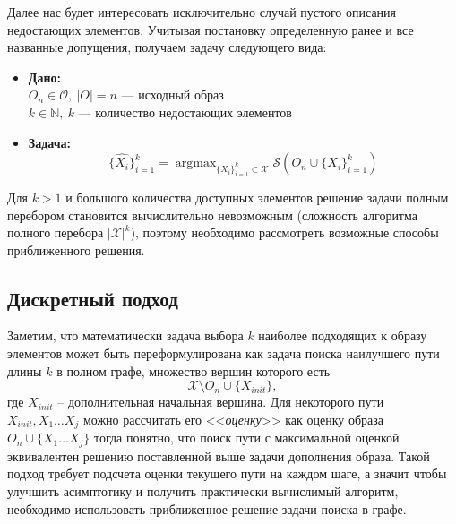 \documentclass[a4paper,14pt]{extarticle}
\DeclareMathOperator*{\argmax}{argmax}
\begin{document}
				Далее нас будет интересовать исключительно случай пустого описания недостающих элементов. Учитывая постановку определенную ранее и все названные допущения, получаем задачу следующего вида:
				\begin{itemize}
					\item[] \textbf{Дано:}\\
					$O_n\in\mathcal{O}, ~|O| = n$ --- исходный образ \\
					$k \in \mathbb{N}, ~k$ --- количество недостающих элементов\\					
					\item[] \textbf{Задача:}
					$$\{\hat{X_i}\}_{i=1}^k= \argmax_{\{X_i\}_{i=1}^k\subset\mathcal{X}} \mathcal{S}\left(O_n\cup\{X_i\}_{i=1}^k\right)$$
				\end{itemize}
				Для $k > 1$ и большого количества доступных элементов решение задачи полным перебором  становится вычислительно невозможным (сложность алгоритма полного перебора $|\mathcal{X}|^k$), поэтому необходимо рассмотреть возможные способы приближенного решения. 
				
			\subsection{Дискретный подход}\label{discrete}
			Заметим, что математически задача выбора $k$ наиболее подходящих к образу элементов может быть переформулирована как задача поиска наилучшего пути длины $k$ в полном графе, множество вершин которого есть 
			$$\mathcal{X}\setminus O_n \cup \{X_{init}\},$$ где $X_{init}$ -- дополнительная начальная вершина. Для некоторого пути $X_{init}, X_1\dots X_j$ можно рассчитать его <<\textit{оценку}>> как оценку образа $O_n\cup\{X_1\dots X_j\}$ тогда понятно, что поиск пути с максимальной оценкой эквивалентен решению поставленной выше задачи дополнения образа. Такой подход требует подсчета оценки текущего пути на каждом шаге, а значит чтобы улучшить асимптотику и получить практически вычислимый алгоритм, необходимо использовать приближенное решение задачи поиска в графе.
			
\end{document}

